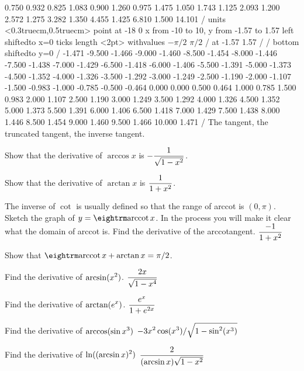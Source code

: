 {0.750 0.932 0.825 1.083 0.900 1.260 0.975 1.475 1.050 1.743 
1.125 2.093 1.200 2.572 1.275 3.282 1.350 4.455 1.425 6.810 
1.500 14.101  /
\setcoordinatesystem units <0.3truecm,0.5truecm> point at -18 0
\setplotarea x from -10 to 10, y from -1.57 to 1.57
\axis left shiftedto x=0 ticks length <2pt> withvalues {$-\pi/2$} {$\pi/2$} /
  at -1.57 1.57 / /
\axis bottom shiftedto y=0 /
\setquadratic
{} -1.471 -9.500 -1.466 -9.000 -1.460 -8.500 -1.454 -8.000 -1.446 
-7.500 -1.438 -7.000 -1.429 -6.500 -1.418 -6.000 -1.406 -5.500 -1.391 
-5.000 -1.373 -4.500 -1.352 -4.000 -1.326 -3.500 -1.292 -3.000 -1.249 
-2.500 -1.190 -2.000 -1.107 -1.500 -0.983 -1.000 -0.785 -0.500 -0.464 
0.000 0.000 0.500 0.464 1.000 0.785 1.500 0.983 2.000 1.107 
2.500 1.190 3.000 1.249 3.500 1.292 4.000 1.326 4.500 1.352 
5.000 1.373 5.500 1.391 6.000 1.406 6.500 1.418 7.000 1.429 
7.500 1.438 8.000 1.446 8.500 1.454 9.000 1.460 9.500 1.466 
10.000 1.471 /
\endpicture}
\endtexonly
{}
\begincaption
The tangent, the truncated tangent, the inverse tangent.
\endcaption
\endfigure

\exercises

\exercise Show that the derivative of $\arccos x$ is $\displaystyle -{1\over
  \sqrt{1-x^2}}$. 
\endexercise

\exercise Show that the derivative of 
$\arctan x$ is $\displaystyle {1\over 1+x^2}$. 
\endexercise

\exercise The inverse of $\cot$ is usually defined so that the
 range of arccot is $(0, \pi )$.  Sketch the graph of $y=\arccot
 x$. In the process you will make it clear what the domain of arccot
 is. Find the derivative of the arccotangent.
\answer $\displaystyle {-1\over 1+x^2}$
\endanswer
\endexercise

\exercise Show that $\arccot x + \arctan x =\pi/2$.
\endexercise

\exercise Find the derivative of $\displaystyle \arcsin(x^2)$.
\answer $\displaystyle {2x\over\sqrt{1-x^4}}$
\endanswer
\endexercise

\exercise Find the derivative of $\displaystyle \arctan(e^x)$.
\answer $\displaystyle {e^x\over1+e^{2x}}$
\endanswer
\endexercise

\exercise Find the derivative of $\displaystyle \arccos (\sin x^3 )$
\answer $\displaystyle -3x^2\cos(x^3)/\sqrt{1-\sin^2(x^3)}$
\endanswer
\endexercise

\exercise Find the derivative of $\displaystyle \ln( (\arcsin x )^2)$
\answer $\displaystyle {2\over(\arcsin x)\sqrt{1-x^2}}$
\endanswer
\endexercise

